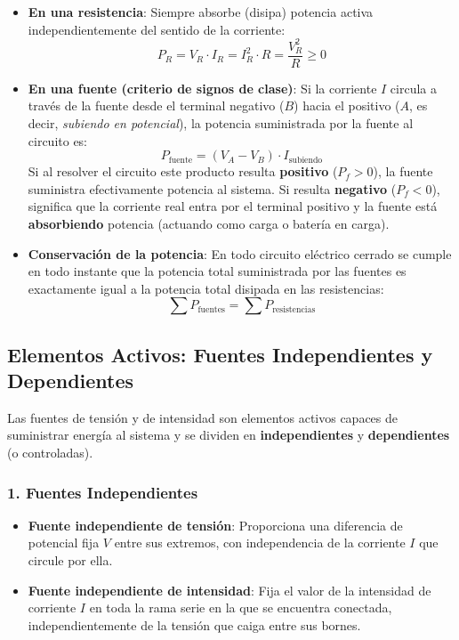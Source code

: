 \begin{ley}
\begin{itemize}
    \item \textbf{En una resistencia}: Siempre absorbe (disipa) potencia activa independientemente del sentido de la corriente:
    \begin{equation}
        P_R = V_R \cdot I_R = I_R^2 \cdot R = \frac{V_R^2}{R} \ge 0
    \end{equation}
    \item \textbf{En una fuente (criterio de signos de clase)}: Si la corriente $I$ circula a través de la fuente desde el terminal negativo ($B$) hacia el positivo ($A$, es decir, \emph{subiendo en potencial}), la potencia suministrada por la fuente al circuito es:
    \begin{equation}
        P_{\text{fuente}} = (V_A - V_B)\cdot I_{\text{subiendo}}
    \end{equation}
    Si al resolver el circuito este producto resulta \textbf{positivo} ($P_f > 0$), la fuente suministra efectivamente potencia al sistema. Si resulta \textbf{negativo} ($P_f < 0$), significa que la corriente real entra por el terminal positivo y la fuente está \textbf{absorbiendo} potencia (actuando como carga o batería en carga).
    \item \textbf{Conservación de la potencia}: En todo circuito eléctrico cerrado se cumple en todo instante que la potencia total suministrada por las fuentes es exactamente igual a la potencia total disipada en las resistencias:
    \begin{equation}
        \sum P_{\text{fuentes}} = \sum P_{\text{resistencias}}
    \end{equation}
\end{itemize}
\end{ley}

\subsection{Elementos Activos: Fuentes Independientes y Dependientes}

Las fuentes de tensión y de intensidad son elementos activos capaces de suministrar energía al sistema y se dividen en \textbf{independientes} y \textbf{dependientes} (o controladas).

\subsubsection{1. Fuentes Independientes}
\begin{itemize}
    \item \textbf{Fuente independiente de tensión}: Proporciona una diferencia de potencial fija $V$ entre sus extremos, con independencia de la corriente $I$ que circule por ella.
    \item \textbf{Fuente independiente de intensidad}: Fija el valor de la intensidad de corriente $I$ en toda la rama serie en la que se encuentra conectada, independientemente de la tensión que caiga entre sus bornes.
\end{itemize}


